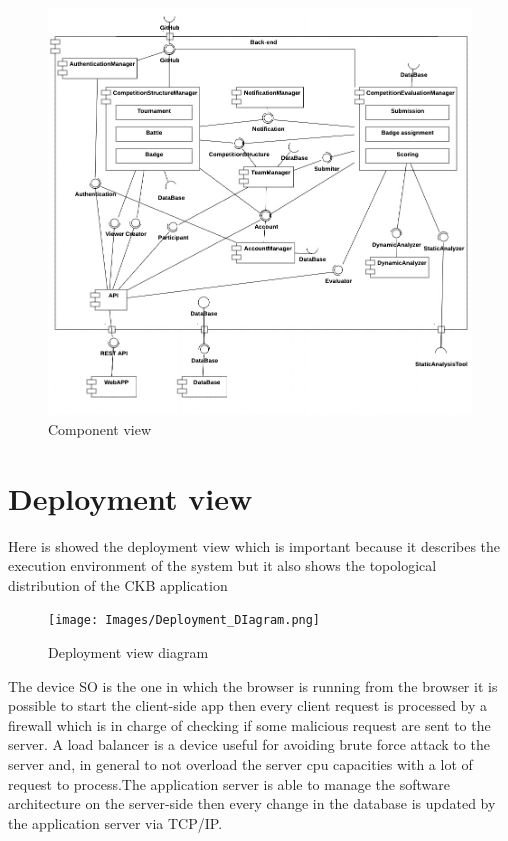 \newpage
\begin{figure}[!h]
    \centering
    \includegraphics[width=\textwidth]{Images/Backend.jpeg}
    \caption{Component view}
    \label{fig:backend}
\end{figure}

\pagebreak
\section{Deployment view}
Here is showed the deployment view which is important because it describes the execution environment of the system but it also shows the topological distribution of the CKB application


\begin{figure}[!h]
    \centering
    \texttt{[image: Images/Deployment\_DIagram.png]}
    \caption{Deployment view diagram}
    \label{fig:dep}
\end{figure}

The device SO is the one in which the browser is running from the browser it is possible to start the client-side app then every client request is processed by a firewall which is in charge of checking if some malicious request are sent to the server. A load balancer is a device useful for avoiding brute force attack to the server and, in general to not overload the server cpu capacities with a lot of request to process.The application server is able to manage the software architecture on the server-side then every change in the database is updated by the application server via TCP/IP.


